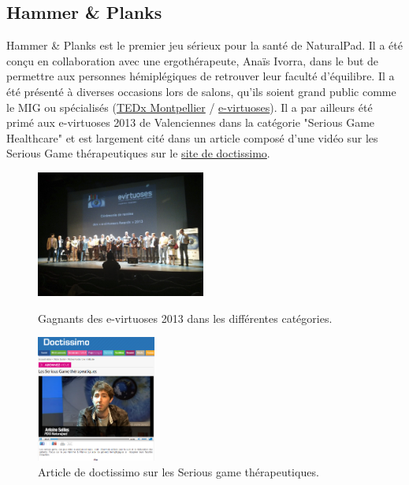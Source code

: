 	\subsection{Hammer \& Planks}
Hammer \& Planks est le premier jeu sérieux pour la santé de NaturalPad. Il a été conçu en collaboration avec une ergothérapeute, Anaïs Ivorra, dans le but de permettre aux personnes hémiplégiques de retrouver leur faculté d’équilibre. Il a été présenté à diverses occasions lors de salons, qu’ils soient grand public comme le MIG ou spécialisés (\href{http://www.ted.com/tedx/events/5188}{TEDx Montpellier} / \href{http://www.e-virtuoses.net/}{e-virtuoses}). Il a par ailleurs été primé aux e-virtuoses 2013 de Valenciennes dans la catégorie "Serious Game Healthcare" et est largement cité dans un article composé d'une vidéo sur les Serious Game thérapeutiques sur le \href{http://videos.doctissimo.fr/sante/recherche/serious-game-therapeutique.html}{site de doctissimo}.
		
\begin{figure}[htbp]
	\begin{minipage}[c]{.45\linewidth}
		\begin{center}
			\includegraphics[width=210px, height=157px]{images/remise_awards_e-virtuoses_groupe.jpg}
			\caption{Gagnants des e-virtuoses 2013 dans les différentes catégories.}
			\label{Gagnants}
		\end{center}
	\end{minipage}
	\hfill
	\begin{minipage}[c]{.45\linewidth}
		\begin{center}
			\includegraphics[height=157px]{images/doctissimo.png}
			\caption{Article de doctissimo sur les Serious game thérapeutiques.}
			\label{naturalpad_groupe}
		\end{center}
	\end{minipage}
\end{figure}		

